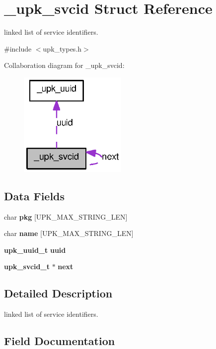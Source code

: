\section{\_\-upk\_\-svcid Struct Reference}
\label{struct__upk__svcid}


linked list of service identifiers.  




{\ttfamily \#include $<$upk\_\-types.h$>$}



Collaboration diagram for \_\-upk\_\-svcid:\nopagebreak
\begin{figure}[H]
\begin{center}
\leavevmode
\includegraphics[width=147pt]{struct__upk__svcid__coll__graph}
\end{center}
\end{figure}
\subsection*{Data Fields}
\begin{DoxyCompactItemize}
\item 
char {\bf pkg} [UPK\_\-MAX\_\-STRING\_\-LEN]
\item 
char {\bf name} [UPK\_\-MAX\_\-STRING\_\-LEN]
\item 
{\bf upk\_\-uuid\_\-t} {\bf uuid}
\item 
{\bf upk\_\-svcid\_\-t} $\ast$ {\bf next}
\end{DoxyCompactItemize}


\subsection{Detailed Description}
linked list of service identifiers. 

\subsection{Field Documentation}
